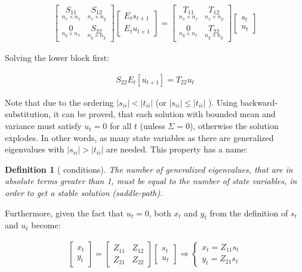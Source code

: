 \documentclass{pracamgr}
\numberwithin{equation}{section}
\newtheorem{mydef}{Definition}
\begin{document}
\begin{align}
\begin{bmatrix} \underset{n_x \times n_x}{S_{11}} & \underset{n_x \times n_y}{S_{12}} \\ \underset{n_y \times n_x}{0} & \underset{n_y \times n_y}{S_{22}}\end{bmatrix} \begin{bmatrix} E_t s_{t+1}\\ E_t u_{t+1} \end{bmatrix} = \begin{bmatrix} \underset{n_x \times n_x}{T_{11}} & \underset{n_x \times n_y}{T_{12}} \\ \underset{n_y \times n_x}{0} & \underset{n_y \times n_y}{T_{22}}\end{bmatrix} \begin{bmatrix} s_t \\ u_t \end{bmatrix}
\end{align}

Solving the lower block first:

\begin{align}
  S_{22} E_t[u_{t+1}] = T_{22} u_t
\end{align}

Note that due to the ordering $|s_{ii}|<|t_{ii}|$ (or $|s_{ii}|\leq|t_{ii}|$ ). Using backward-substitution, it can be proved, that each solution with bounded mean and variance must satisfy $u_t=0$ for all $t$ (unless $\Sigma=0$), otherwise the solution explodes. In other words, as many state variables as there are generalized eigenvalues with $|s_{ii}|>|t_{ii}|$ are needed. This property has a name:

\begin{mydef}[\citet{blanchard1980solution} conditions]
The number of generalized eigenvalues, that are in absolute terms greater than 1, must be equal to the number of state variables, in order to get a stable solution (saddle-path).
\end{mydef}

Furthermore, given the fact that $u_t=0$, both $x_t$ and $y_t$ from the definition of $s_t$ and $u_t$ become:

\begin{align}
  \begin{bmatrix} x_t \\ y_t \end{bmatrix} = \begin{bmatrix} Z_{11} & Z_{12}\\ Z_{21} & Z_{22} \end{bmatrix} \begin{bmatrix} s_t \\ u_t \end{bmatrix}
  \Rightarrow
  \begin{cases}
    x_t = Z_{11} s_t\\
    y_t = Z_{21} s_t
  \end{cases}
\end{align}
\end{document}
